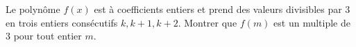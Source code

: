 Le polynôme $f(x)$ est à coefficients entiers et prend des valeurs divisibles par $3$ en trois entiers consécutifs $k, k + 1, k + 2$. Montrer que $f(m)$ est un multiple de $3$ pour tout entier $m$.
